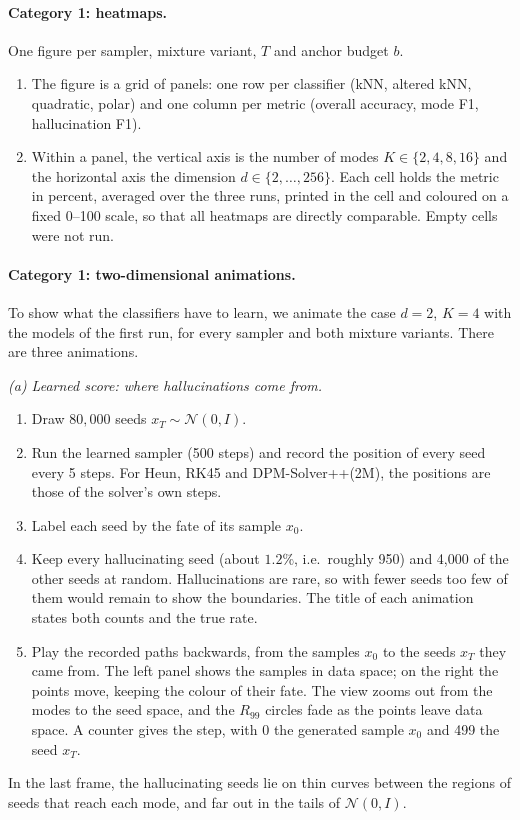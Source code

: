 \documentclass[11pt]{article}
\begin{document}
\paragraph{Category 1: heatmaps.}
One figure per sampler, mixture variant, $T$ and anchor budget $b$.
\begin{enumerate}
    \item The figure is a grid of panels: one row per classifier (kNN, altered kNN, quadratic,
    polar) and one column per metric (overall accuracy, mode F1, hallucination F1).
    \item Within a panel, the vertical axis is the number of modes $K \in \{2, 4, 8, 16\}$ and the
    horizontal axis the dimension $d \in \{2, \dots, 256\}$. Each cell holds the metric in percent,
    averaged over the three runs, printed in the cell and coloured on a fixed 0--100 scale, so that
    all heatmaps are directly comparable. Empty cells were not run.
\end{enumerate}

\paragraph{Category 1: two-dimensional animations.}
To show what the classifiers have to learn, we animate the case $d = 2$, $K = 4$ with the models of
the first run, for every sampler and both mixture variants. There are three animations.

\textit{(a) Learned score: where hallucinations come from.}
\begin{enumerate}
    \item Draw $80{,}000$ seeds $x_T \sim \mathcal{N}(0, I)$.
    \item Run the learned sampler (500 steps) and record the position of every seed every 5 steps.
    For Heun, RK45 and DPM-Solver++(2M), the positions are those of the solver's own steps.
    \item Label each seed by the fate of its sample $x_0$.
    \item Keep every hallucinating seed (about $1.2\%$, i.e.\ roughly 950) and 4{,}000 of the other
    seeds at random. Hallucinations are rare, so with fewer seeds too few of them would remain to
    show the boundaries. The title of each animation states both counts and the true rate.
    \item Play the recorded paths backwards, from the samples $x_0$ to the seeds $x_T$ they came
    from. The left panel shows the samples in data space; on the right the points move, keeping the
    colour of their fate. The view zooms out from the modes to the seed space, and the $R_{99}$
    circles fade as the points leave data space. A counter gives the step, with 0 the generated
    sample $x_0$ and 499 the seed $x_T$.
\end{enumerate}
In the last frame, the hallucinating seeds lie on thin curves between the regions of seeds that
reach each mode, and far out in the tails of $\mathcal{N}(0, I)$.
\end{document}
